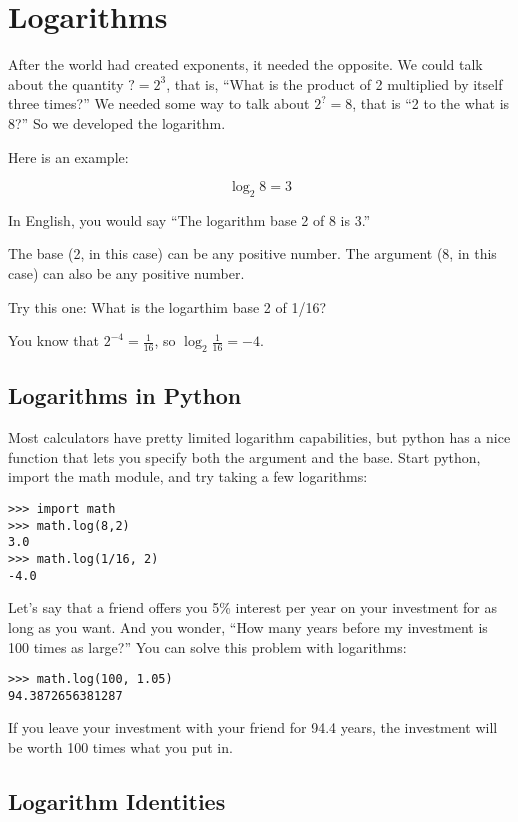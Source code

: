 \chapter{Logarithms}

After the world had created exponents, it needed the opposite. We
could talk about the quantity $? = 2^3$, that is, ``What is the
product of 2 multiplied by itself three times?''  We needed some way
to talk about $2^? = 8$, that is ``2 to the what is 8?'' So we
developed the logarithm. 

Here is an example:

$$\log_{2}8 = 3$$

In English, you would say ``The logarithm base 2 of 8 is 3.''

The base (2, in this case) can be any positive number. The argument
(8, in this case) can also be any positive number.

Try this one: What is the logarthim base 2 of 1/16?

You know that $2^{-4} = \frac{1}{16}$, so $\log_{2} \frac{1}{16} = -4$.

\section{Logarithms in Python}

Most calculators have pretty limited logarithm capabilities, but
python has a nice  function that lets you specify both
the argument and the base.  Start python, import the math module, and try taking a few logarithms:

\begin{Verbatim}
>>> import math
>>> math.log(8,2)
3.0
>>> math.log(1/16, 2)
-4.0
\end{Verbatim}

Let's say that a friend offers you 5\% interest per year on your
investment for as long as you want. And you wonder, ``How many years
before my investment is 100 times as large?'' You can solve this problem with logarithms:

\begin{Verbatim}
>>> math.log(100, 1.05)
94.3872656381287
\end{Verbatim}

If you leave your investment with your friend for 94.4 years, the
investment will be worth 100 times what you put in.

\section{Logarithm Identities}

